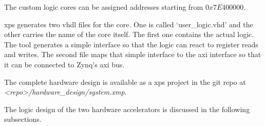 The custom logic cores can be assigned addresses starting from $0x7E400000$.

\gls{xps} generates two \gls{vhdl} files for the core.
One is called `user\_logic.vhd' and the other carries the name of the core
itself.
The first one contains the actual logic.
The tool generates a simple interface so that the logic can react to register
reads and writes.
The second file maps that simple interface to the \gls{axi} interface so that
it can be connected to Zynq's \gls{axi} bus.

The complete hardware design is available as a \gls{xps} project in the git repo
at \emph{<repo>/hardware\_design/system.xmp}.

The logic design of the two hardware accelerators is discussed in the following
subsections.
